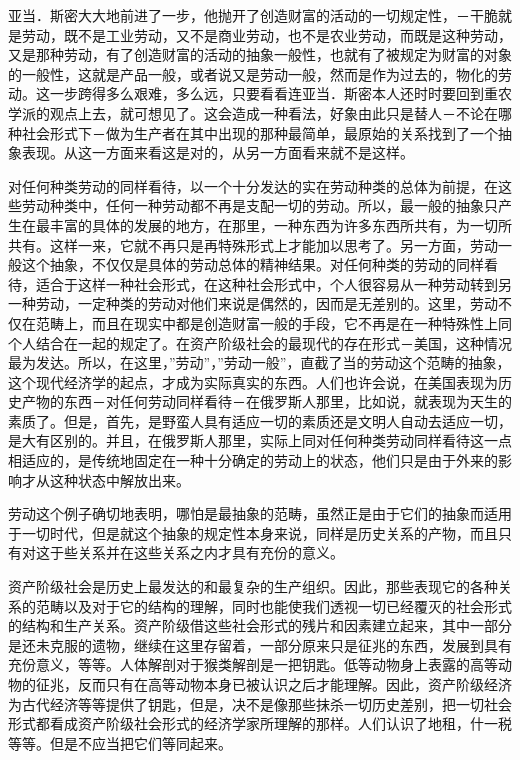 \documentclass[a4paper,twoside,12pt,AutoFakeBold]{ctexart}
\begin{document}
亚当．斯密大大地前进了一步，他抛开了创造财富的活动的一切规定性，－干脆就是劳动，既不是工业劳动，又不是商业劳动，也不是农业劳动，而既是这种劳动，又是那种劳动，有了创造财富的活动的抽象一般性，也就有了被规定为财富的对象的一般性，这就是产品一般，或者说又是劳动一般，然而是作为过去的，物化的劳动。这一步跨得多么艰难，多么远，只要看看连亚当．斯密本人还时时要回到重农学派的观点上去，就可想见了。这会造成一种看法，好象由此只是替人－不论在哪种社会形式下－做为生产者在其中出现的那种最简单，最原始的关系找到了一个抽象表现。从这一方面来看这是对的，从另一方面看来就不是这样。

对任何种类劳动的同样看待，以一个十分发达的实在劳动种类的总体为前提，在这些劳动种类中，任何一种劳动都不再是支配一切的劳动。所以，最一般的抽象只产生在最丰富的具体的发展的地方，在那里，一种东西为许多东西所共有，为一切所共有。这样一来，它就不再只是再特殊形式上才能加以思考了。另一方面，劳动一般这个抽象，不仅仅是具体的劳动总体的精神结果。对任何种类的劳动的同样看待，适合于这样一种社会形式，在这种社会形式中，个人很容易从一种劳动转到另一种劳动，一定种类的劳动对他们来说是偶然的，因而是无差别的。这里，劳动不仅在范畴上，而且在现实中都是创造财富一般的手段，它不再是在一种特殊性上同个人结合在一起的规定了。在资产阶级社会的最现代的存在形式－美国，这种情况最为发达。所以，在这里，”劳动”，”劳动一般”，直截了当的劳动这个范畴的抽象，这个现代经济学的起点，才成为实际真实的东西。人们也许会说，在美国表现为历史产物的东西－对任何劳动同样看待－在俄罗斯人那里，比如说，就表现为天生的素质了。但是，首先，是野蛮人具有适应一切的素质还是文明人自动去适应一切，是大有区别的。并且，在俄罗斯人那里，实际上同对任何种类劳动同样看待这一点相适应的，是传统地固定在一种十分确定的劳动上的状态，他们只是由于外来的影响才从这种状态中解放出来。

劳动这个例子确切地表明，哪怕是最抽象的范畴，虽然正是由于它们的抽象而适用于一切时代，但是就这个抽象的规定性本身来说，同样是历史关系的产物，而且只有对这于些关系并在这些关系之内才具有充份的意义。

资产阶级社会是历史上最发达的和最复杂的生产组织。因此，那些表现它的各种关系的范畴以及对于它的结构的理解，同时也能使我们透视一切已经覆灭的社会形式的结构和生产关系。资产阶级借这些社会形式的残片和因素建立起来，其中一部分是还未克服的遗物，继续在这里存留着，一部分原来只是征兆的东西，发展到具有充份意义，等等。人体解剖对于猴类解剖是一把钥匙。低等动物身上表露的高等动物的征兆，反而只有在高等动物本身已被认识之后才能理解。因此，资产阶级经济为古代经济等等提供了钥匙，但是，决不是像那些抹杀一切历史差别，把一切社会形式都看成资产阶级社会形式的经济学家所理解的那样。人们认识了地租，什一税等等。但是不应当把它们等同起来。
\end{document}
